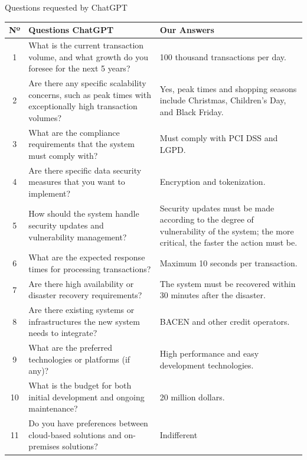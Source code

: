  Questions requested by ChatGPT 
\begin{table}[ht]
    \centering
    \footnotesize    
    \setlength{\tabcolsep}{10pt}
    \label{board:quality-attribute-questions}
    \begin{tabularx}{\textwidth}{|c|X|X|}  \hline    
        \rowcolor{gray!19} \textbf{Nº} & \textbf{Questions ChatGPT} & \textbf{ Our Answers} \\ \hline
        1 & What is the current transaction volume, and what growth do you foresee for the next 5 years? & 100 thousand transactions per day. \\
        \rowcolor{gray!19}
        2 & Are there any specific scalability concerns, such as peak times with exceptionally high transaction volumes? & Yes, peak times and shopping seasons include Christmas, Children's Day, and Black Friday. \\        
        3 & What are the compliance requirements that the system must comply with? & Must comply with PCI DSS and LGPD. \\
        \rowcolor{gray!19}
        4 & Are there specific data security measures that you want to implement? & Encryption and tokenization. \\        
        5 & How should the system handle security updates and vulnerability management? & Security updates must be made according to the degree of vulnerability of the system; the more critical, the faster the action must be. \\
        \rowcolor{gray!19}
        6 & What are the expected response times for processing transactions? & Maximum 10 seconds per transaction. \\        
        7 & Are there high availability or disaster recovery requirements? & The system must be recovered within 30 minutes after the disaster. \\
        \rowcolor{gray!19}
        8 & Are there existing systems or infrastructures the new system needs to integrate? & BACEN and other credit operators. \\        
        9 & What are the preferred technologies or platforms (if any)? & High performance and easy development technologies. \\
        \rowcolor{gray!19}
        10 & What is the budget for both initial development and ongoing maintenance? & 20 million dollars. \\        
        11 & Do you have preferences between cloud-based solutions and on-premises solutions? & Indifferent \\

\end{tabularx}
\end{table}

